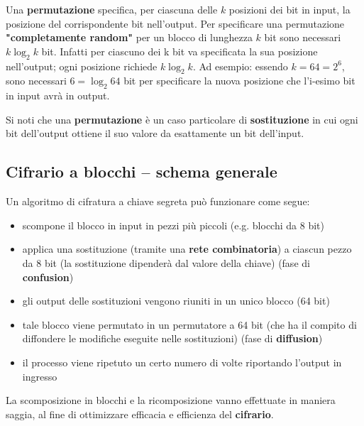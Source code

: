 Una \textbf{permutazione} specifica, per ciascuna delle $k$ posizioni dei bit in input, la posizione del corrispondente bit nell'output. Per specificare una permutazione \textbf{"completamente random"} per un blocco di lunghezza $k$ bit sono necessari $k\log_2 k$ bit. Infatti per ciascuno dei k bit va specificata la sua posizione nell'output; ogni posizione richiede $k\log_2 k$. Ad esempio: essendo $k = 64 = 2^6$, sono necessari $6 = \log_2 {64}$ bit per specificare la nuova posizione che l'i-esimo bit in input avrà in output. \newline \newline

Si noti che una \textbf{permutazione} è un caso particolare di \textbf{sostituzione} in cui ogni bit dell'output ottiene il suo valore da esattamente un bit dell'input.

\subsection{Cifrario a blocchi – schema generale}
Un algoritmo di cifratura a chiave segreta può funzionare come segue:
\begin{itemize}
  \item scompone il blocco in input in pezzi più piccoli (e.g. blocchi da 8 bit)
  \item applica una sostituzione (tramite una \textbf{rete combinatoria}) a ciascun pezzo da 8 bit (la sostituzione dipenderà dal valore della chiave) (fase di \textbf{confusion})
  \item gli output delle sostituzioni vengono riuniti in un unico blocco (64 bit)
  \item tale blocco viene permutato in un permutatore a 64 bit (che ha il compito di diffondere le modifiche eseguite nelle sostituzioni) (fase di \textbf{diffusion})
  \item il processo viene ripetuto un certo numero di volte riportando l'output in ingresso
\end{itemize}
La scomposizione in blocchi e la ricomposizione vanno effettuate in maniera saggia, al fine di ottimizzare efficacia e efficienza del \textbf{cifrario}.
